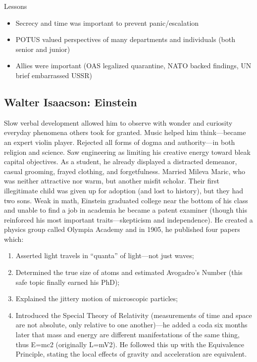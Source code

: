 \documentclass[
]{article}
\begin{document}
Lessons

\begin{itemize}
\item
  Secrecy and time was important to prevent panic/escalation
\item
  POTUS valued perspectives of many departments and individuals (both
  senior and junior)
\item
  Allies were important (OAS legalized quarantine, NATO backed findings,
  UN brief embarrassed USSR)
\end{itemize}

\hypertarget{walter-isaacson-einstein}{%
\subsection{Walter Isaacson: Einstein}\label{walter-isaacson-einstein}}

Slow verbal development allowed him to observe with wonder and curiosity
everyday phenomena others took for granted. Music helped him
think---became an expert violin player. Rejected all forms of dogma and
authority---in both religion and science. Saw engineering as limiting
his creative energy toward bleak capital objectives. As a student, he
already displayed a distracted demeanor, casual grooming, frayed
clothing, and forgetfulness. Married Mileva Maric, who was neither
attractive nor warm, but another misfit scholar. Their first
illegitimate child was given up for adoption (and lost to history), but
they had two sons. Weak in math, Einstein graduated college near the
bottom of his class and unable to find a job in academia he became a
patent examiner (though this reinforced his most important
traits---skepticism and independence). He created a physics group called
Olympia Academy and in 1905, he published four papers which:

\begin{enumerate}
\def\labelenumi{\arabic{enumi}.}
\item
  Asserted light travels in ``quanta'' of light---not just waves;
\item
  Determined the true size of atoms and estimated Avogadro's Number
  (this safe topic finally earned his PhD);
\item
  Explained the jittery motion of microscopic particles;
\item
  Introduced the Special Theory of Relativity (measurements of time and
  space are not absolute, only relative to one another)---he added a
  coda six months later that mass and energy are different
  manifestations of the same thing, thus E=mc2 (originally L=mV2). He
  followed this up with the Equivalence Principle, stating the local
  effects of gravity and acceleration are equivalent.
\end{enumerate}
\end{document}
